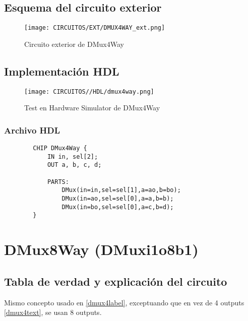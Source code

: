 \documentclass[12pt]{article}
\begin{document}
    \subsection{Esquema del circuito exterior}
        \begin{figure}[H]
            \centering
            \texttt{[image: CIRCUITOS/EXT/DMUX4WAY\_ext.png]}            
            \caption{Circuito exterior de DMux4Way \cite{circuitverse}}
            \label{fig:dmux4way_ext}
        \end{figure}
    \subsection{Implementación HDL}
        \begin{figure}[H]
            \centering
            \texttt{[image: CIRCUITOS//HDL/dmux4way.png]}
            \caption{Test en Hardware Simulator de DMux4Way \cite{nand2tetris}}
            \label{fig:hdldmux4way}
        \end{figure}
        \subsubsection{Archivo HDL}
            \begin{lstlisting}
        CHIP DMux4Way {
            IN in, sel[2];
            OUT a, b, c, d;
        
            PARTS:
                DMux(in=in,sel=sel[1],a=ao,b=bo);
                DMux(in=ao,sel=sel[0],a=a,b=b);
                DMux(in=bo,sel=sel[0],a=c,b=d);
        }
            \end{lstlisting}
    \newpage


\section{DMux8Way (DMuxi1o8b1)}
    \subsection{Tabla de verdad y explicación del circuito}
        Mismo concepto usado en \ref{dmux4label}, exceptuando que en vez de 4 outputs \ref{dmux4text}, se usan 8 outputs. \cite{nisan_nand2tetris_2005}
\end{document}
